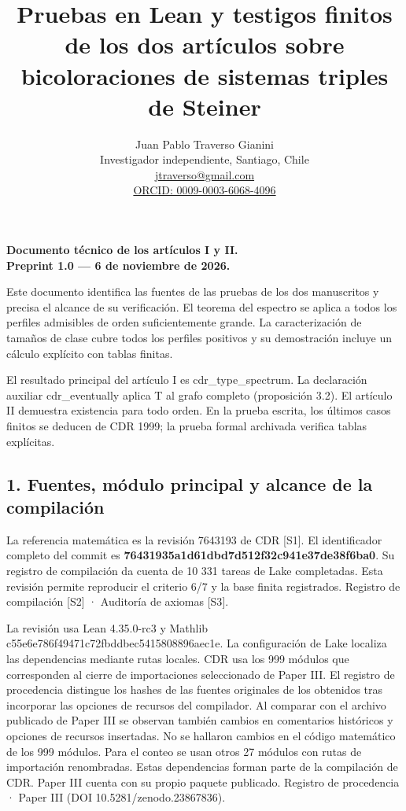 \documentclass[spanish,11pt,a4paper]{article}
\title{Pruebas en Lean y testigos finitos de los dos artículos sobre bicoloraciones de sistemas triples de Steiner}
\author{Juan Pablo Traverso Gianini\\\small Investigador independiente, Santiago, Chile\\\small \href{mailto:jtraverso@gmail.com}{jtraverso@gmail.com}\\\small \href{https://orcid.org/0009-0003-6068-4096}{ORCID: 0009-0003-6068-4096}}
\date{}
\begin{document}
\raggedbottom
\maketitle
\textbf{Documento técnico de los artículos I y II.}\\\textbf{Preprint 1.0 — 6 de noviembre de 2026.}

Este documento identifica las fuentes de las pruebas de los dos manuscritos y precisa el alcance de su verificación. El teorema del espectro se aplica a todos los perfiles admisibles de orden suficientemente grande. La caracterización de tamaños de clase cubre todos los perfiles positivos y su demostración incluye un cálculo explícito con tablas finitas.

El resultado principal del artículo I es cdr\_type\_spectrum. La declaración auxiliar cdr\_eventually aplica T al grafo completo (proposición 3.2). El artículo II demuestra existencia para todo orden. En la prueba escrita, los últimos casos finitos se deducen de CDR 1999; la prueba formal archivada verifica tablas explícitas.

\subsection{1. Fuentes, módulo principal y alcance de la compilación}\label{fuentes-muxf3dulo-principal-y-alcance-de-la-compilaciuxf3n}

La referencia matemática es la revisión 7643193 de CDR {[}S1{]}. El identificador completo del commit es \textbf{76431935a1\allowbreak{}d61dbd7d51\allowbreak{}2f32c941e3\allowbreak{}7de38f6ba0}. Su registro de compilación da cuenta de 10 331 tareas de Lake completadas. Esta revisión permite reproducir el criterio 6/7 y la base finita registrados. Registro de compilación {[}S2{]} · Auditoría de axiomas {[}S3{]}.

La revisión usa Lean 4.35.0-rc3 y Mathlib c55e6e786f\allowbreak{}49471c72fb\allowbreak{}ddbec54158\allowbreak{}08896aec1e. La configuración de Lake localiza las dependencias mediante rutas locales. CDR usa los 999 módulos que corresponden al cierre de importaciones seleccionado de Paper III. El registro de procedencia distingue los hashes de las fuentes originales de los obtenidos tras incorporar las opciones de recursos del compilador. Al comparar con el archivo publicado de Paper III se observan también cambios en comentarios históricos y opciones de recursos insertadas. No se hallaron cambios en el código matemático de los 999 módulos. Para el conteo se usan otros 27 módulos con rutas de importación renombradas. Estas dependencias forman parte de la compilación de CDR. Paper III cuenta con su propio paquete publicado. Registro de procedencia · Paper III (DOI 10.5281/zenodo.23867836).
\end{document}
